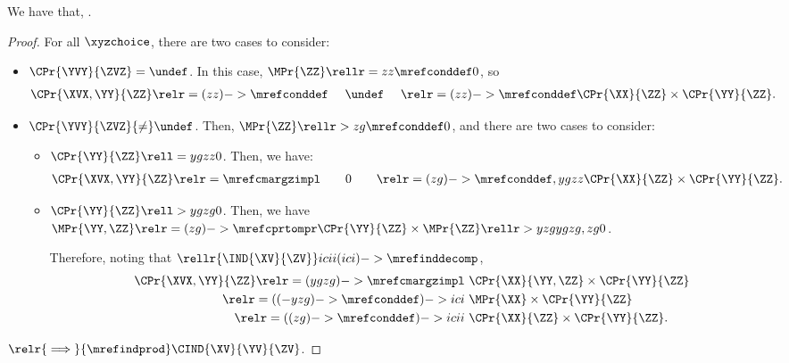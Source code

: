 \begin{proposition}
  We have that, \indwundefb.%
\end{proposition}

\begin{proof}
  For all $\xyzchoice$, there are two cases to consider:
  \begin{itemize}
    \item {} $\CPr{\YVY}{\ZVZ} = \undef$. In this case, $\MPr{\ZZ} \rellr = zz {\mrefconddef} 0$, so
      \begin{align*}
        \CPr{\XVX, \YY}{\ZZ} \relr = {(zz)->\mrefconddef} \ \ \ \ \undef\ \ \ \  
        \relr = {(zz)->\mrefconddef} \CPr{\XX}{\ZZ}\times \CPr{\YY}{\ZZ}.
      \end{align*}
    \item {} $\CPr{\YVY}{\ZVZ} {\ne} \undef$. Then, $\MPr{\ZZ} \rellr > zg {\mrefconddef} 0$, and there are two cases to consider:
      \begin{itemize}
        \item {} $\CPr{\YY}{\ZZ} \rell = ygzz 0$. Then, we have:
        \begin{align*}
          \CPr{\XVX, \YY}{\ZZ} \relr = {\mrefcmargzimpl} \ \ \ \ \ \ 0 \ \ \ \ \ \ 
          \relr = {(zg)->\mrefconddef,ygzz} \CPr{\XX}{\ZZ}\times \CPr{\YY}{\ZZ}.
        \end{align*}
        \item \nrp 14 $\CPr{\YY}{\ZZ} \rell > ygzg 0$. 
        Then, we have $\MPr{\YY, \ZZ}  \relr = {(zg)->\mrefcprtompr} \CPr{\YY}{\ZZ} \times \MPr{\ZZ} \rellr > yzg {ygzg,zg} 0$.

        \nrp 15
        Therefore, noting that $\rellr {\IND{\XV}{\ZV}} icii {(ici)->\mrefinddecomp} $,
        \begin{align*}
          \CPr{\XVX, \YY}{\ZZ} \relr = {(ygzg)->\mrefcmargzimpl} &\ \CPr{\XX}{\YY, \ZZ} \times \CPr{\YY}{\ZZ}\\
          \relr = {((-yzg)->\mrefconddef)->ici} &\ \MPr{\XX} \times \CPr{\YY}{\ZZ}\\
          \relr = {((zg)->\mrefconddef)->icii} &\ \CPr{\XX}{\ZZ}\times \CPr{\YY}{\ZZ}.
        \end{align*}
      \end{itemize}
  \end{itemize}
  $\relr {\implies} {\mrefindprod} \CIND{\XV}{\YV}{\ZV}$.
\end{proof}

